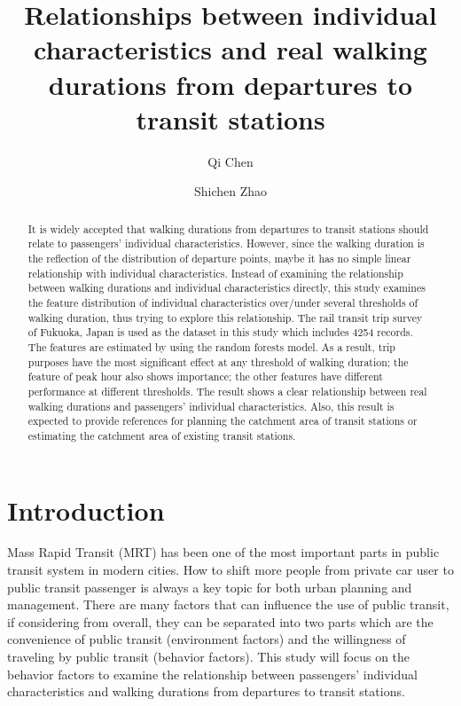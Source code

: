 \documentclass[Journal,letterpaper]{ascelike-new}
\begin{document}
\title{Relationships between individual characteristics and real walking durations from departures to transit stations}
%
\author[1]{Qi Chen}
\author[2]{Shichen Zhao}
%
%
\maketitle

\begin{abstract}
It is widely accepted that walking durations from departures to transit stations should relate to passengers' individual characteristics. However, since the walking duration is the reflection of the distribution of departure points, maybe it has no simple linear relationship with individual characteristics. Instead of examining the relationship between walking durations and individual characteristics directly, this study examines the feature distribution of individual characteristics over/under several thresholds of walking duration, thus trying to explore this relationship. The rail transit trip survey of Fukuoka, Japan is used as the dataset in this study which includes 4254 records. The features are estimated by using the random forests model. As a result, trip purposes have the most significant effect at any threshold of walking duration; the feature of peak hour also shows importance; the other features have different performance at different thresholds. The result shows a clear relationship between real walking durations and passengers' individual characteristics. Also, this result is expected to provide references for planning the catchment area of transit stations or estimating the catchment area of existing transit stations.
\end{abstract}

%
\section{Introduction}
Mass Rapid Transit (MRT) has been one of the most important parts in public transit system in modern cities. How to shift more people from private car user to public transit passenger is always a key topic for both urban planning and management. There are many factors that can influence the use of public transit, if considering from overall, they can be separated into two parts which are the convenience of public transit (environment factors) and the willingness of traveling by public transit (behavior factors). This study will focus on the behavior factors to examine the relationship between passengers' individual characteristics and walking durations from departures to transit stations.
\end{document}
